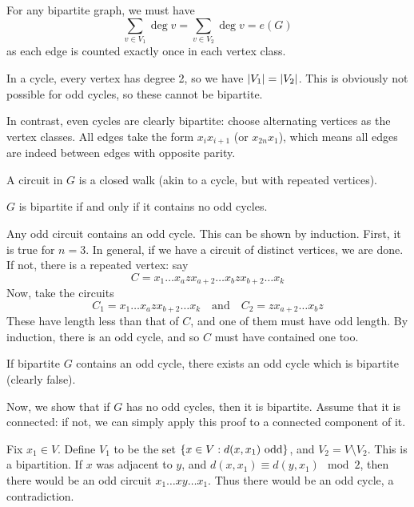 \documentclass{article}
\begin{document}
\begin{prf}
	For any bipartite graph, we must have
	\[
	\sum_{v \in V_1} \deg v = \sum_{v \in V_2} \deg v = e(G)
	\]
	as each edge is counted exactly once in each vertex class.
	
	In a cycle, every vertex has degree 2, so we have $\left\lvert V_1 \right\rvert = \left\lvert V_2 \right\rvert$. This is obviously not possible for odd cycles, so these cannot be bipartite.
	
	In contrast, even cycles are clearly bipartite: choose alternating vertices as the vertex classes. All edges take the form $x_i x_{i+1}$ (or $x_{2n}x_1$), which means all edges are indeed between edges with opposite parity.
\end{prf}

\begin{definition}[Circuit]
    \label{circuit-definition}
    A circuit in $G$ is a closed walk (akin to a cycle, but with repeated vertices).
\end{definition}

\begin{proposition}
	$G$ is bipartite if and only if it contains no odd cycles.
\end{proposition}

\begin{prf}
	 Any odd circuit contains an odd cycle. This can be shown by induction. First, it is true for $n = 3$. In general, if we have a circuit of distinct vertices, we are done. If not, there is a repeated vertex: say
	\[
	C = x_1 \ldots x_a z x_{a+2} \ldots x_b z x_{b+2} \ldots x_k
	\]
	Now, take the circuits 
	\[
	C_1 = x_1 \ldots x_a z x_{b+2} \ldots x_k \quad \text{and} \quad 
	C_2 = z x_{a+2} \ldots x_b z
	\]
	These have length less than that of $C$, and one of them must have odd length. By induction, there is an odd cycle, and so $C$ must have contained one too.
	
	If bipartite $G$ contains an odd cycle, there exists an odd cycle which is bipartite (clearly false).
	
	Now, we show that if $G$ has no odd cycles, then it is bipartite. Assume that it is connected: if not, we can simply apply this proof to a connected component of it.
	
	Fix $x_1 \in V$. Define $V_1$ to be the set $\left\lbrace x \in V : d(x, x_1) \text{ odd} \right\rbrace$, and $V_2 = V \setminus V_2$. This is a bipartition. If $x$ was adjacent to $y$, and $d(x, x_1) \equiv d(y, x_1) \mod 2$, then there would be an odd circuit $x_1 \ldots x y \ldots x_1$. Thus there would be an odd cycle, a contradiction.
\end{prf}
\end{document}
